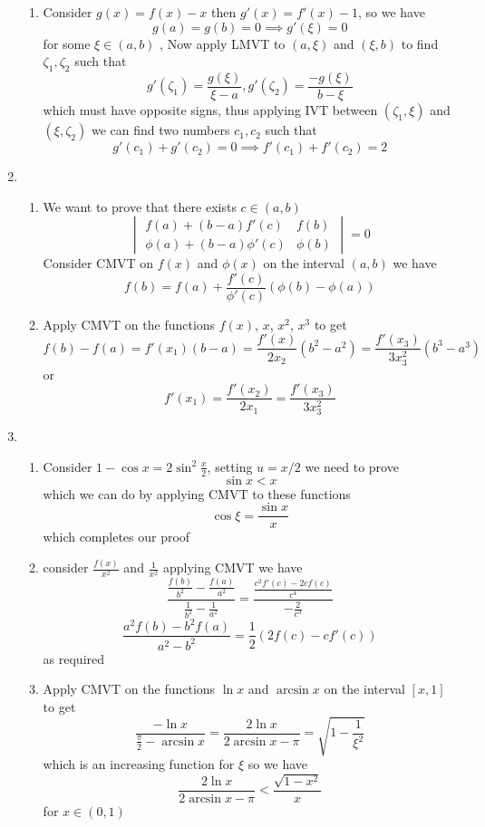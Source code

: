 \documentclass[12pt]{article}
\begin{document}
\begin{enumerate}
\begin{enumerate}
				\item
					Consider $g(x)= f(x)-x$ then $g'(x) = f'(x)-1$, so we have
					$$
					g(a) = g(b) = 0 \implies g'(\xi) = 0
					$$
					for some $\xi \in(a,b)$ , Now apply LMVT to $(a,\xi)$ and $(\xi, b)$ to find $\zeta_{1}, \zeta_{2}$ such that
					$$
					g'(\zeta_{1}) = \frac{g(\xi)}{\xi-a}, g'(\zeta_{2}) = \frac{-g(\xi)}{b-\xi}
					$$
					which must have opposite signs, thus applying IVT between $(\zeta_{1}, \xi)$ and $(\xi,\zeta_{2})$ we can find two numbers $c_{1}, c_{2}$ such that
					$$
					\boxed{
						g'(c_{1})+ g'(c_{2}) = 0 \implies f'(c_{1}) + f'(c_{2}) = 2
					}
					$$
			\end{enumerate}
		\item
			\begin{enumerate}
				
				\item
					We want to prove that there exists $c \in(a,b)$
					$$
					\begin{vmatrix}
						f(a) + (b-a)f'(c) & f(b) \\
						\phi(a) + (b-a)\phi'(c) & \phi(b) 
					\end{vmatrix}=0
					$$
					Consider CMVT on $f(x)$ and $\phi(x)$ on the interval $(a, b)$ we have
					$$
					f(b) = f(a) + \frac{f'(c)}{\phi'(c)} (\phi(b)-\phi(a))
					$$
				\item 
					Apply CMVT on the functions $f(x)$, $x$, $x^{2}$, $x^{3}$ to get
					$$
					f(b)-f(a) = f'(x_{1})(b-a) = \frac{f'(x)}{2x_{2}}(b^{2}-a^{2}) = \frac{f'(x_{3})}{3x_{3}^{2}}(b^{3}-a^{3})
					$$
					or
					$$
					f'(x_{1})=\frac{f'(x_{2})}{2x_{1}} = \frac{f'(x_{3})}{3x_{3}^{2}}
					$$
			\end{enumerate}
		\item
			\begin{enumerate}

				\item
					Consider $1-\cos x = 2\sin ^{2} \frac{x}{2}$, setting $u = x/2$ we need to prove 
					$$
					\sin x < x
					$$
					which we can do by applying CMVT to these functions
					$$
					\cos \xi = \frac{\sin x }{x}
					$$
					which completes our proof

				\item
					consider $\frac{f(x)}{x^{2}}$ and $\frac{1}{x^{2}}$ applying CMVT we have
					$$
					\frac{\frac{f(b)}{b^{2}}-\frac{f(a)}{a^{2}}}{\frac{1}{b^{2}}-\frac{1}{a^{2}}} = \frac{\frac{c^{2}f'(c) - 2cf(c)}{c^{4}}}{-\frac{2}{c^{3}}}
					$$
					$$
					\frac{a^{2}f(b)-b^{2}f(a)}{a^{2}-b^{2}} = \frac{1}{2} (2f(c)-cf'(c))
					$$
					as required
				\item
					Apply CMVT on the functions $\ln x$ and $\arcsin x$ on the interval $[x,1]$ to get
					$$
					\frac{-\ln x}{\frac{\pi}{2}-\arcsin x} = \frac{2\ln x}{2\arcsin x-\pi} = \sqrt{ 1-\frac{1}{\xi^{2}} }
					$$
					which is an increasing function for $\xi$ so we have
					$$
					\frac{2\ln x}{2\arcsin x-\pi} < \frac{\sqrt{ 1-x^{2} }}{x}
					$$
					for $x \in (0,1)$


\end{enumerate}
\end{enumerate}
\end{document}
